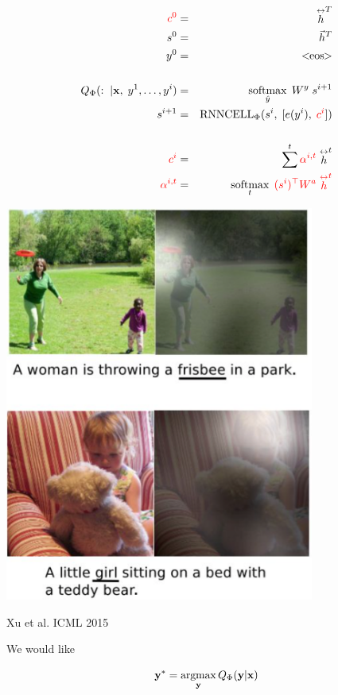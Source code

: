 {

\begin{eqnarray*}
  {\color{red} c^0} & = & \stackrel{\leftrightarrow}{h}^T \\
  s^0 & = & \vec{h}^T \\
  y^0 & = & <\!\!\mathrm{eos}\!\!> \\
  \\
  Q_\Phi(:\;| {\bf x},\;y^1,\ldots,y^i) & = & \operatorname*{softmax}_{\hat{y}} \;W^y \;s^{i+1} \\
  s^{i+1} & = & \mathrm{RNNCELL}_\Phi(s^i,\;[e(y^i),\;{\color{red} c^i}]) \\
  \\
  {\color{red} c^i} & = & \sum^t {\color{red} \alpha^{i,t}} \stackrel{\leftrightarrow}{h}^t  \\
  {\color{red} \alpha^{i,t}} & = & \operatorname*{softmax}_t\; {\color{red} (s^i)^\top W^a \stackrel{\leftrightarrow}{h}^t}
\end{eqnarray*}


\centerline{\includegraphics[width = 4in]{../images/AttentionInCaptioning1}}
\centerline{Xu et al. ICML 2015}


We would like

\vfill
$${\bf y}^* = \operatorname*{argmax}_{\bf y} Q_\Phi({\bf y}|{\bf x})$$

}
